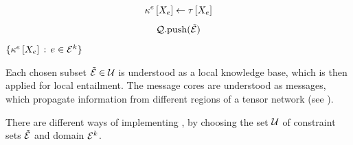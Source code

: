 \begin{algorithm}[hbt!]
\begin{algorithmic}
            \If{$\hypercoreat{\catvariableof{\edge}}\neq\kcoreofat{\edge}{\catvariableof{\edge}}$}
                \begin{align*}
                    \kappa^{e}\left[X_{e}\right] \leftarrow \tau\left[X_{e}\right]
                \end{align*}
                    \begin{align*}
                        \mathcal{Q}\mathrm{.push(}\tilde{\mathcal{E}}\mathrm{)}
                    \end{align*}
                \EndFor
            \EndIf
        \EndWhile
        \State \Return $\{\kappa^{e}\left[X_{e}\right]\,:\,e\in\mathcal{E}^{k}\}$
    \end{algorithmic}
\end{algorithm}

Each chosen subset $\tilde{\mathcal{E}}\in\mathcal{U}$ is understood as a local knowledge base, which is then applied for local entailment.
The message cores are understood as messages, which propagate information from different regions of a tensor network (see ).

There are different ways of implementing , by choosing the set $\mathcal{U}$ of constraint sets $\tilde{\mathcal{E}}$ and domain $\mathcal{E}^{k}$. %





